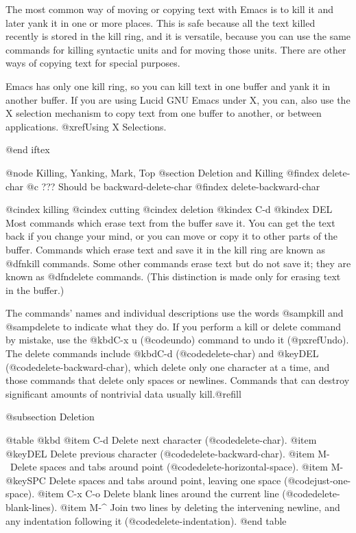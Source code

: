 {{{  The most common way of moving or copying text with Emacs is to kill it
and later yank it in one or more places.  This is safe because all the
text killed recently is stored in the kill ring, and it is versatile,
because you can use the same commands for killing syntactic units and
for moving those units.  There are other ways of copying text for
special purposes.

  Emacs has only one kill ring, so you can kill text in one buffer and yank
it in another buffer. If you are using Lucid GNU Emacs under X, you can,
also use the X selection mechanism to copy text from one buffer to
another, or between applications. @xref{Using X Selections}.

@end iftex

@node Killing, Yanking, Mark, Top
@section Deletion and Killing
@findex delete-char
@c ??? Should be backward-delete-char
@findex delete-backward-char

@cindex killing
@cindex cutting
@cindex deletion
@kindex C-d
@kindex DEL
  Most commands which erase text from the buffer save it. You can get
the text back if you change your mind, or you can move or copy it to
other parts of the buffer.  Commands which erase text and save it in the
kill ring are known as @dfn{kill} commands.  Some other commands erase
text but do not save it; they are known as @dfn{delete} commands.  (This
distinction is made only for erasing text in the buffer.)

The commands' names and individual descriptions use the words
@samp{kill} and @samp{delete} to indicate what they do.  If you perform
a kill or delete command by mistake, use the @kbd{C-x u} (@code{undo})
command to undo it (@pxref{Undo}). The delete commands include @kbd{C-d}
(@code{delete-char}) and @key{DEL} (@code{delete-backward-char}), which
delete only one character at a time, and those commands that delete only
spaces or newlines.  Commands that can destroy significant amounts of
nontrivial data usually kill.@refill

@subsection Deletion

@table @kbd
@item C-d
Delete next character (@code{delete-char}).
@item @key{DEL}
Delete previous character (@code{delete-backward-char}).
@item M-\
Delete spaces and tabs around point (@code{delete-horizontal-space}).
@item M-@key{SPC}
Delete spaces and tabs around point, leaving one space
(@code{just-one-space}).
@item C-x C-o
Delete blank lines around the current line (@code{delete-blank-lines}).
@item M-^
Join two lines by deleting the intervening newline, and any indentation
following it (@code{delete-indentation}).
@end table

}}}

